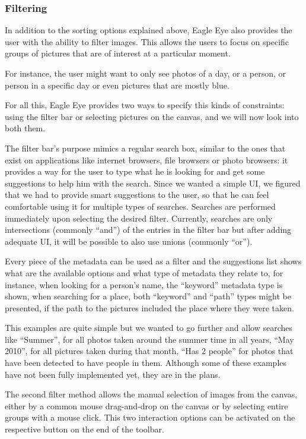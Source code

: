 \subsubsection{Filtering} %
\label{ss:filtering}

In addition to the sorting options explained above, Eagle Eye also provides the user with the ability to filter images. This allows the users to focus on specific groups of pictures that are of interest at a particular moment.

For instance, the user might want to only see photos of a day, or a person, or person in a specific day or even pictures that are mostly blue.

For all this, Eagle Eye provides two ways to specify this kinds of constraints: using the filter bar or selecting pictures on the canvas, and we will now look into both them.

The filter bar's purpose mimics a regular search box, similar to the ones that exist on applications like internet browsers, file browsers or photo browsers: it provides a way for the user to type what he is looking for and get some suggestions to help him with the search. Since we wanted a simple \ac{UI}, we figured that we had to provide smart suggestions to the user, so that he can feel comfortable using it for multiple types of searches. Searches are performed immediately upon selecting the desired filter. Currently, searches are only intersections (commonly ``and'') of the entries in the filter bar but after adding adequate \ac{UI}, it will be possible to also use unions (commonly ``or'').

Every piece of the metadata can be used as a filter and the suggestions list shows what are the available options and what type of metadata they relate to, for instance, when looking for a person's name, the ``keyword'' metadata type is shown, when searching for a place, both ``keyword'' and ``path'' types might be presented, if the path to the pictures included the place where they were taken.

This examples are quite simple but we wanted to go further and allow searches like ``Summer'', for all photos taken around the summer time in all years, ``May 2010'', for all pictures taken during that month, ``Has 2 people'' for photos that have been detected to have people in them. Although some of these examples have not been fully implemented yet, they are in the plans. 

The second filter method allows the manual selection of images from the canvas, either by a common mouse drag-and-drop on the canvas or by selecting entire groups with a mouse click. This two interaction options can be activated on the respective button on the end of the toolbar. 


